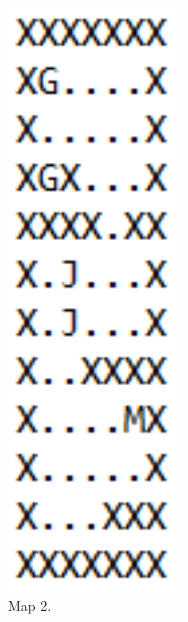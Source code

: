 \documentclass[../report.tex]{subfiles}
\begin{document}
\begin{figure}[H]
\begin{subfigure}[b]{0.19\textwidth}
        \includegraphics[width=0.5\textwidth]{figures/solver_design/map2.png}
        \captionsetup{width=0.9\textwidth}
        \caption{Map 2.}
        \label{subfig:map2}
    \end{subfigure}
    \begin{subfigure}[b]{0.19\textwidth}
        \centering

\end{subfigure}
\end{figure}
\end{document}
